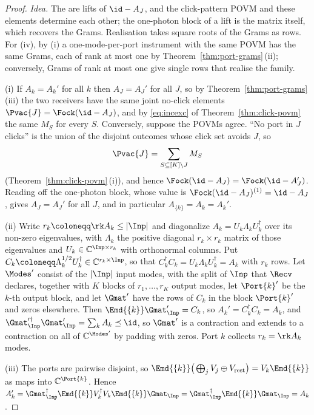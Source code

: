 \begin{proof}
\emph{Idea.} The  are lifts of $\id-A_J$, and the
click-pattern POVM and these elements determine each other; the one-photon
block of a lift is the matrix itself, which recovers the Grams. Realisation
takes square roots of the Grams as rows. For (iv), by (i) a
one-mode-per-port instrument with the same POVM has the same Grams, each of
rank at most one by Theorem~\ref{thm:port-grams}\,(ii); conversely, Grams of
rank at most one give single rows that realise the family.

(i) If $A_k=A_k'$ for all $k$ then $A_J=A_J'$ for all $J$, so by
Theorem~\ref{thm:port-grams}\,(iii) the two receivers have the same joint no-click
elements $\Pvac{J}=\Fock(\id-A_J)$, and by \eqref{eq:incexc} of
Theorem~\ref{thm:click-povm} the same $M_S$ for every $S$. Conversely, suppose the
POVMs agree. ``No port in $J$ clicks'' is the union of the disjoint outcomes
whose click set avoids $J$, so
\begin{equation}\label{eq:recoverpivac}
  \Pvac{J}=\sum_{S\subseteq[K]\setminus J}M_S
\end{equation}
(Theorem~\ref{thm:click-povm}\,(i)), and hence $\Fock(\id-A_J)=\Fock(\id-A_J')$.
Reading off the one-photon block, whose value is
$\Fock(\id-A_J)^{(1)}=\id-A_J$, gives $A_J=A_J'$ for all $J$, and in
particular $A_{\{k\}}=A_k=A_k'$.

(ii) Write $r_k\coloneqq\rk A_k\le|\Inp|$ and diagonalize
$A_k=U_k\Lambda_kU_k^\dagger$ over its non-zero eigenvalues, with $\Lambda_k$
the positive diagonal $r_k\times r_k$ matrix of those eigenvalues and
$U_k\in\mathbb{C}^{\Inp\times r_k}$ with orthonormal columns. Put
$C_k\coloneqq\Lambda_k^{1/2}U_k^\dagger\in\mathbb{C}^{r_k\times\Inp}$, so
that $C_k^\dagger C_k=U_k\Lambda_kU_k^\dagger=A_k$ with $r_k$ rows. Let
$\Modes'$ consist of the $|\Inp|$ input modes, with the split of $\Inp$ that
$\Recv$ declares, together with $K$ blocks of $r_1,\dots,r_K$ output modes,
let $\Port{k}'$ be the $k$-th output block, and let $\Gmat'$ have the rows of
$C_k$ in the block $\Port{k}'$ and zeros elsewhere. Then
$\Emd{\{k\}}\Gmat'_{\Inp}=C_k$, so $A_k'=C_k^\dagger C_k=A_k$, and
$\Gmat'^\dagger_{\Inp}\Gmat'_{\Inp}=\sum_kA_k\preceq\id$, so $\Gmat'$ is a
contraction and extends to a contraction on all of $\mathbb{C}^{\Modes'}$ by
padding with zeros. Port $k$ collects $r_k=\rk A_k$ modes.

(iii) The ports are pairwise disjoint, so
$\Emd{\{k\}}\big(\bigoplus_jV_j\oplus V_{\mathrm{rest}}\big)
=V_k\Emd{\{k\}}$ as maps into $\mathbb{C}^{\Port{k}}$. Hence
$A_k'=\Gmat_{\Inp}^\dagger\Emd{\{k\}}V_k^\dagger V_k\Emd{\{k\}}\Gmat_{\Inp}
=\Gmat_{\Inp}^\dagger\Emd{\{k\}}\Gmat_{\Inp}=A_k$.


\end{proof}
